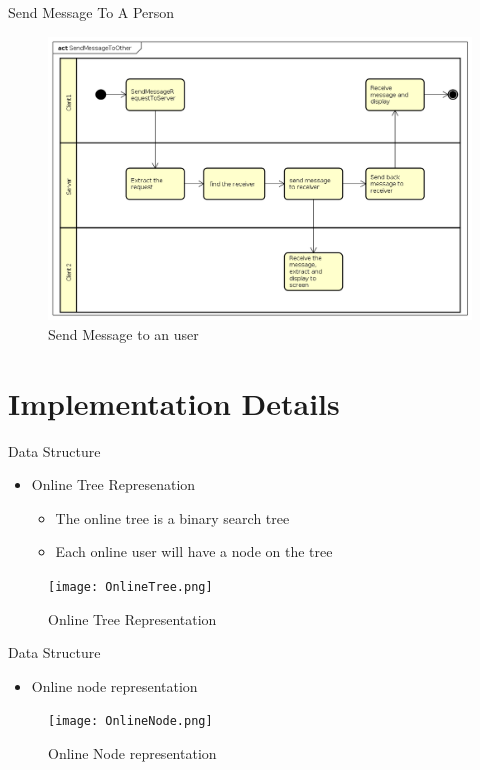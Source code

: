 \documentclass{beamer}
\begin{document}
\begin{frame}{Send Message To A Person}
\begin{center}
	\begin{figure}
		\includegraphics[scale=0.3]{SendMessageToOther.png}
		\caption{Send Message to an user}
	\end{figure}
\end{center}
\end{frame}
 
\section{Implementation Details}
\begin{frame}{Data Structure}

\begin{itemize}
	\item Online Tree Represenation
	\begin{itemize}
		\item The online tree is a binary search tree
		\item Each online user will have a node on the tree
	\end{itemize}
\end{itemize}

\begin{center}
	\begin{figure}
		\texttt{[image: OnlineTree.png]}
		\caption{Online Tree Representation}
	\end{figure}
\end{center}
\end{frame}


\begin{frame}{ Data Structure}
	\begin{itemize}
		\item Online node representation
	\end{itemize}
	
	\begin{figure}
		\texttt{[image: OnlineNode.png]}
		\caption{Online Node representation}
	\end{figure}
\end{frame}
\end{document}
